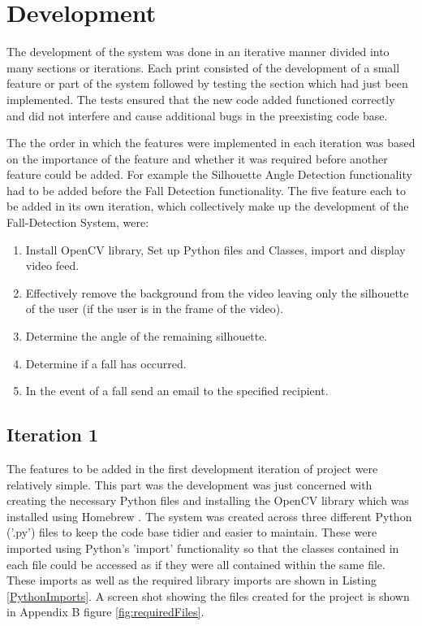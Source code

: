 \documentclass[11pt,a4paper]{report}
\begin{document}
\pagebreak

\section{Development}
The development of the system was done in an iterative manner divided into many sections or iterations. Each print consisted of the development of a small feature or part of the system followed by testing the section which had just been implemented. The tests ensured that the new code added functioned correctly and did not interfere and cause additional bugs in the preexisting code base.

The the order in which the features were implemented in each iteration was based on the importance of the feature and whether it was required before another feature could be added. For example the Silhouette Angle Detection functionality had to be added before the Fall Detection functionality. The five feature each to be added in its own iteration, which collectively make up the development of the Fall-Detection System, were:

\begin{enumerate}
\item Install OpenCV library, Set up Python files and Classes, import and display video feed.
\item Effectively remove the background from the video leaving only the silhouette of the user (if the user is in the frame of the video).
\item Determine the angle of the remaining silhouette.
\item Determine if a fall has occurred.
\item In the event of a fall send an email to the specified recipient.
\end{enumerate}

\subsection{Iteration 1}

The features to be added in the first development iteration of project were relatively simple. This part was the development was just concerned with creating the necessary Python files and installing the OpenCV library which was installed using Homebrew \citep{Homebrew}. The system was created across three different Python ('.py') files to keep the code base tidier and easier to maintain. These were imported using Python's 'import' functionality so that the classes contained in each file could be accessed as if they were all contained within the same file. These imports as well as the required library imports are shown in Listing \ref{PythonImports}. A screen shot showing the files created for the project is shown in Appendix B figure \ref{fig:requiredFiles}. 
\end{document}
